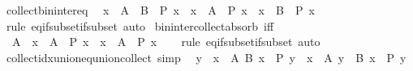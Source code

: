 \begin{isabellebody}
\endisatagproof
{\isafoldproof}%
%
\isadelimproof
\isanewline
%
\endisadelimproof
\isanewline
{}\isamarkupfalse%
\ collect{\isacharunderscore}{\kern0pt}bin{\isacharunderscore}{\kern0pt}inter{\isacharunderscore}{\kern0pt}eq{\isacharcolon}{\kern0pt}\isanewline
\ \ {\isachardoublequoteopen}{\isacharbraceleft}{\kern0pt}x\ {\isasymin}\ A\ {\isasyminter}\ B\ {\isacharbar}{\kern0pt}\ P\ x{\isacharbraceright}{\kern0pt}\ {\isacharequal}{\kern0pt}\ {\isacharbraceleft}{\kern0pt}x\ {\isasymin}\ A\ {\isacharbar}{\kern0pt}\ P\ x{\isacharbraceright}{\kern0pt}\ {\isasyminter}\ {\isacharbraceleft}{\kern0pt}x\ {\isasymin}\ B\ {\isacharbar}{\kern0pt}\ P\ x{\isacharbraceright}{\kern0pt}{\isachardoublequoteclose}\isanewline
%
\isadelimproof
\ \ %
\endisadelimproof
%
\isatagproof
{}\isamarkupfalse%
\ {\isacharparenleft}{\kern0pt}rule\ eq{\isacharunderscore}{\kern0pt}if{\isacharunderscore}{\kern0pt}subset{\isacharunderscore}{\kern0pt}if{\isacharunderscore}{\kern0pt}subset{\isacharparenright}{\kern0pt}\ auto%
\endisatagproof
{\isafoldproof}%
%
\isadelimproof
\isanewline
%
\endisadelimproof
\isanewline
{}\isamarkupfalse%
\ bin{\isacharunderscore}{\kern0pt}inter{\isacharunderscore}{\kern0pt}collect{\isacharunderscore}{\kern0pt}absorb\ {\isacharbrackleft}{\kern0pt}iff{\isacharbrackright}{\kern0pt}{\isacharcolon}{\kern0pt}\isanewline
\ \ {\isachardoublequoteopen}A\ {\isasyminter}\ {\isacharbraceleft}{\kern0pt}x\ {\isasymin}\ A\ {\isacharbar}{\kern0pt}\ P\ x{\isacharbraceright}{\kern0pt}\ {\isacharequal}{\kern0pt}\ {\isacharbraceleft}{\kern0pt}x\ {\isasymin}\ A\ {\isacharbar}{\kern0pt}\ P\ x{\isacharbraceright}{\kern0pt}{\isachardoublequoteclose}\isanewline
%
\isadelimproof
\ \ %
\endisadelimproof
%
\isatagproof
{}\isamarkupfalse%
\ {\isacharparenleft}{\kern0pt}rule\ eq{\isacharunderscore}{\kern0pt}if{\isacharunderscore}{\kern0pt}subset{\isacharunderscore}{\kern0pt}if{\isacharunderscore}{\kern0pt}subset{\isacharparenright}{\kern0pt}\ auto%
\endisatagproof
{\isafoldproof}%
%
\isadelimproof
\isanewline
%
\endisadelimproof
\isanewline
{}\isamarkupfalse%
\ collect{\isacharunderscore}{\kern0pt}idx{\isacharunderscore}{\kern0pt}union{\isacharunderscore}{\kern0pt}eq{\isacharunderscore}{\kern0pt}union{\isacharunderscore}{\kern0pt}collect\ {\isacharbrackleft}{\kern0pt}simp{\isacharbrackright}{\kern0pt}{\isacharcolon}{\kern0pt}\isanewline
\ \ {\isachardoublequoteopen}{\isacharbraceleft}{\kern0pt}y\ {\isasymin}\ {\isacharparenleft}{\kern0pt}{\isasymUnion}x\ {\isasymin}\ A{\isachardot}{\kern0pt}\ B\ x{\isacharparenright}{\kern0pt}\ {\isacharbar}{\kern0pt}\ P\ y{\isacharbraceright}{\kern0pt}\ {\isacharequal}{\kern0pt}\ {\isacharparenleft}{\kern0pt}{\isasymUnion}x\ {\isasymin}\ A{\isachardot}{\kern0pt}\ {\isacharbraceleft}{\kern0pt}y\ {\isasymin}\ B\ x\ {\isacharbar}{\kern0pt}\ P\ y{\isacharbraceright}{\kern0pt}{\isacharparenright}{\kern0pt}{\isachardoublequoteclose}\isanewline

\end{isabellebody}
